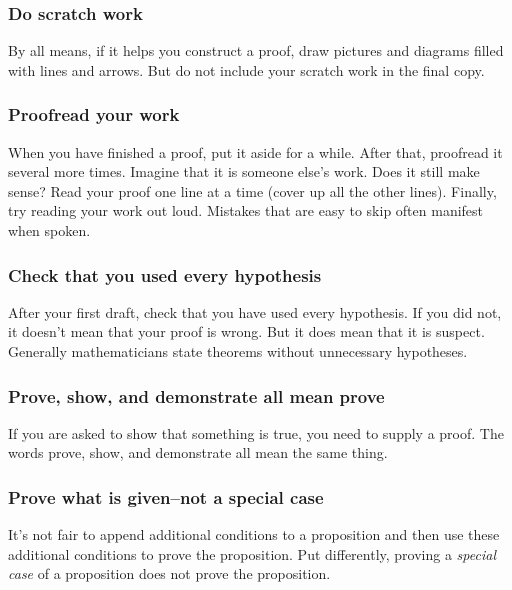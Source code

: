 \documentclass[12pt]{article}
\newcounter{id}\setcounter{id}{0}
\newcounter{se}\setcounter{se}{0}
\begin{document}


 \subsubsection{ Do scratch work}

By all means, if it helps you construct a proof, draw pictures and
diagrams filled with lines and arrows.  But do not include your scratch
work in the final copy.

 \subsubsection{ Proofread your work}

When you have finished a proof, put it aside for a while.  After that,
proofread it several more times. Imagine that it is someone else's
work.  Does it still make sense?  Read your proof one line at a time
(cover up all the other lines). Finally, try reading your work out
loud. Mistakes that are easy to skip often manifest when spoken.


 \subsubsection{ Check that you used every hypothesis}

After your first draft, check that you have used every hypothesis.
If you did not, it doesn't mean that your proof is wrong.  But it
does mean that it is  suspect.  Generally mathematicians
state theorems without unnecessary hypotheses.

 \subsubsection{ Prove, show, and demonstrate all mean prove}

If you are asked to show that something is true, you need to
supply a proof.  The words prove, show, and demonstrate all mean the
same thing. 

 \subsubsection{ Prove what is given--not a special case}

It's not fair to append additional conditions to a proposition and 
then use these additional conditions to prove the proposition.  Put
differently, proving a {\em special case\/} of a proposition does not
prove the proposition. 
\end{document}

